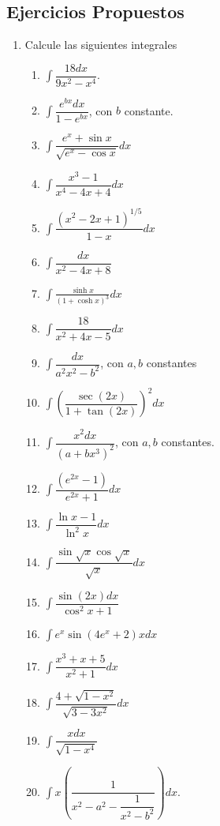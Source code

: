 \documentclass[10pt,twoside]{SelfArx} %
\begin{document}
 
 
 \subsection{Ejercicios Propuestos}
\begin{enumerate}
	\item Calcule las siguientes integrales
	\begin{enumerate}
		\item $ \displaystyle\int \dfrac{18dx}{9x^{2}-x^{4}} $.
		\item $ \displaystyle\int \dfrac{e^{bx}dx}{1-e^{bx}} $, con $ b $ constante.
		\item $ \displaystyle\int \dfrac{e^{x}+\sin x}{\sqrt{e^{x}-\cos x}}dx $
		\item $ \displaystyle\int \dfrac{x^{3}-1}{x^{4}-4x+4}dx $
		\item $ \displaystyle\int\dfrac{(x^{2}-2x+1)^{1/5}}{1-x}dx $
		\item $ \displaystyle\int \dfrac{dx}{x^{2}-4x+8} $
		\item $ \displaystyle\int \frac{\sinh x}{(1+\cosh x)^{3}}dx $
		\item $ \displaystyle\int \dfrac{18}{x^{2}+4x-5}dx $
		\item $ \displaystyle\int \dfrac{dx}{a^{2}x^{2}-b^{2}} $, con $ a,b $ constantes
		\item $ \displaystyle\int \left (\dfrac{\sec(2x)}{1+\tan(2x)}\right )^{2}dx $
		\item $ \displaystyle\int \dfrac{x^{2}dx}{(a+bx^{3})^{2}} $, con $ a,b $ constantes.
		\item $ \displaystyle\int \dfrac{(e^{2x}-1)}{e^{2x}+1}dx $
		\item $ \displaystyle\int \dfrac{\ln x-1}{\ln^{2}x}dx $
		\item $ \displaystyle\int \dfrac{\sin\sqrt{x}\cos\sqrt{x}}{\sqrt{x}}dx $
		\item $ \displaystyle\int \dfrac{\sin(2x)dx}{\cos^{2}x+1} $
		\item $ \displaystyle\int e^{x}\sin(4e^{x}+2)xdx $
		\item $ \displaystyle\int \dfrac{x^{3}+x+5}{x^{2}+1}dx $
		\item $ \displaystyle\int\dfrac{4+\sqrt{1-x^{2}}}{\sqrt{3-3x^{2}}}dx $
		\item $ \displaystyle\int \dfrac{xdx}{\sqrt{1-x^{4}}} $
		\item $ \displaystyle\int x\left (\dfrac{1}{x^{2}-a^{2}-\dfrac{1}{x^{2}-b^{2}}}\right )dx $.
    \end{enumerate}		

\end{enumerate}
\end{document}
